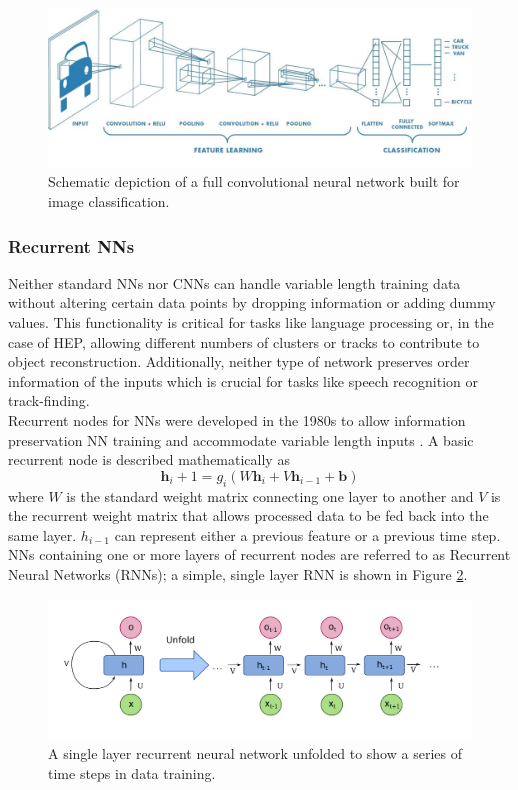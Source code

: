 \begin{figure}[htb!]
    \centering
    \includegraphics[width=4.5in]{figures/chapter4/full_cnn.png}
    \caption{Schematic depiction of a full convolutional neural network built for image classification.}
    \label{fig:full_cnn}
\end{figure}

\subsubsection{Recurrent NNs}
Neither standard NNs nor CNNs can handle variable length training data without altering certain data points by dropping information or adding dummy values. This functionality is critical for tasks like language processing or, in the case of HEP, allowing different numbers of clusters or tracks to contribute to object reconstruction. Additionally, neither type of network preserves order information of the inputs which is crucial for tasks like speech recognition or track-finding.\\

Recurrent nodes for NNs were developed in the 1980s to allow information preservation NN training and accommodate variable length inputs \cite{rnn_paper}. A basic recurrent node is described mathematically as 
$$
\mathbf{h}_i+1=g_i(W\mathbf{h}_i+V\mathbf{h}_{i-1}+\mathbf{b})
$$
\noindent where $W$ is the standard weight matrix connecting one layer to another and $V$ is the recurrent weight matrix that allows processed data to be fed back into the same layer. $h_{i-1}$ can represent either a previous feature or a previous time step. NNs containing one or more layers of recurrent nodes are referred to as Recurrent Neural Networks (RNNs); a simple, single layer RNN is shown in Figure \ref{fig:rnn}.\\  

\begin{figure}[htb!]
    \centering
    \includegraphics[width=5in]{figures/chapter4/rnn.png}
    \caption{A single layer recurrent neural network unfolded to show a series of time steps in data training.}
    \label{fig:rnn}
\end{figure}

